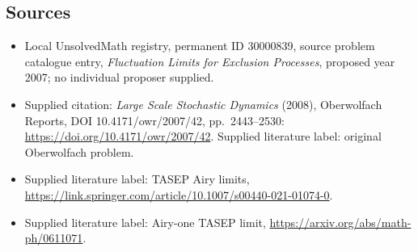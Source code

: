 \documentclass[11pt]{article}
\begin{document}
\subsection{Sources}
\begin{itemize}\item Local UnsolvedMath registry, permanent ID 30000839, source problem catalogue entry, \emph{Fluctuation Limits for Exclusion Processes}, proposed year 2007; no individual proposer supplied.\item Supplied citation: \emph{Large Scale Stochastic Dynamics} (2008), Oberwolfach Reports, DOI 10.4171/owr/2007/42, pp.\ 2443--2530: \url{https://doi.org/10.4171/owr/2007/42}. Supplied literature label: original Oberwolfach problem.\item Supplied literature label: TASEP Airy limits, \url{https://link.springer.com/article/10.1007/s00440-021-01074-0}.\item Supplied literature label: Airy-one TASEP limit, \url{https://arxiv.org/abs/math-ph/0611071}.\end{itemize}
\end{document}
